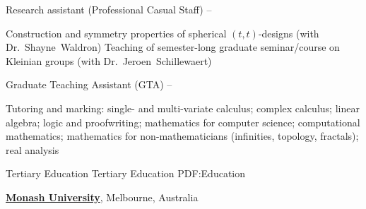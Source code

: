 \documentclass[a4paper,yyyy,nonstopmode,10pt]{simpleresumecv}
\begin{document}
\begin{Body}
\Gap
\BulletItem
Research assistant (Professional Casual Staff)
\hfill
{}--
\begin{Detail}
\SubBulletItem
Construction and symmetry properties of spherical $ (t,t)$-designs (with Dr.~Shayne~Waldron)
\SubBulletItem
Teaching of semester-long graduate seminar/course on Kleinian groups (with Dr.~Jeroen~Schillewaert)
\end{Detail}

\Gap
\BulletItem
Graduate Teaching Assistant (GTA)
\hfill
{}--
\begin{Detail}
\SubBulletItem
Tutoring and marking: single- and multi-variate calculus; complex calculus; linear algebra; logic and proofwriting; mathematics for computer science; computational mathematics; mathematics for non-mathematicians (infinities, topology, fractals); real analysis
\end{Detail}




\Section
{Tertiary Education}
{Tertiary Education}
{PDF:Education}

\Entry
\href{http://monash.edu.au/}
{\textbf{Monash University}},
Melbourne, Australia


\end{Body}
\end{document}
